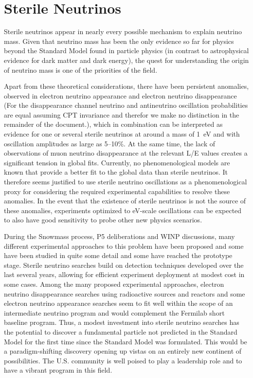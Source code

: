 \section{Sterile Neutrinos}
\label{sec:Sterile}

Sterile neutrinos appear in nearly every possible mechanism to explain
neutrino mass. Given that neutrino mass has been the only evidence so
far for physics beyond the Standard Model found in particle physics
(in contrast to astrophysical evidence for dark matter and dark
energy), the quest for understanding the origin of neutrino mass is
one of the priorities of the field.

Apart from these theoretical considerations, there have been
persistent anomalies, observed in electron neutrino appearance and
electron neutrino disappearance (For the disappearance channel
neutrino and antineutrino oscillation probabilities are equal assuming
CPT invariance and therefor we make no distinction in the remainder of
the document.), which in combination can be interpreted as evidence
for one or several sterile neutrinos at around a mass of 1~eV and with
oscillation amplitudes as large as 5--10\%. At the same time, the lack
of observations of muon neutrino disappearance at the relevant L/E
values creates a significant tension in global fits. Currently, no
phenomenological models are known that provide a better fit to the
global data than sterile neutrinos. It therefore seems justified to
use sterile neutrino oscillations as a phenomenological proxy for
considering the required experimental capabilities to resolve these
anomalies. In the event that the existence of sterile neutrinos is not
the source of these anomalies, experiments optimized to eV-scale
oscillations can be expected to also have good sensitivity to probe
other new physics scenarios.

During the Snowmass process, P5 deliberations and WINP discussions,
many different experimental approaches to this problem have been
proposed and some have been studied in quite some detail and some have
reached the prototype stage. Sterile neutrino searches build on
detection techniques developed over the last several years, allowing
for efficient experiment deployment at modest cost in some cases.
Among the many proposed experimental approaches, electron neutrino
disappearance searches using radioactive sources and reactors and some
electron neutrino appearance searches seem to fit well within the
scope of an intermediate neutrino program and would complement the
Fermilab short baseline program. Thus, a modest investment into
sterile neutrino searches has the potential to discover a fundamental 
particle not
predicted in the Standard Model for the first time since the Standard
Model was formulated. This would be a paradigm-shifting discovery
opening up vistas on an entirely new continent of possibilities. The
U.S. community is well poised to play a leadership role and to have a
vibrant program in this field.

